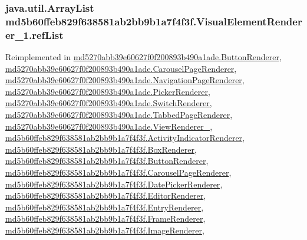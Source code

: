 {\subsubsection[{refList}]{\setlength{\rightskip}{0pt plus 5cm}java.util.ArrayList {\bf md5b60ffeb829f638581ab2bb9b1a7f4f3f.VisualElementRenderer\_\-1.refList}}}
\label{classmd5b60ffeb829f638581ab2bb9b1a7f4f3f_1_1_visual_element_renderer__1_4ebd0e42ebd360712eb189930036fc9f}




Reimplemented in \hyperlink{classmd5270abb39e60627f0f200893b490a1ade_1_1_button_renderer_2a4a0404703b01e8d3b5f88cd8313a90}{md5270abb39e60627f0f200893b490a1ade.ButtonRenderer}, \hyperlink{classmd5270abb39e60627f0f200893b490a1ade_1_1_carousel_page_renderer_d48d9d828a4c63961f1670b716f7dacb}{md5270abb39e60627f0f200893b490a1ade.CarouselPageRenderer}, \hyperlink{classmd5270abb39e60627f0f200893b490a1ade_1_1_navigation_page_renderer_d437aec87e29f0fb2592513dc48257bd}{md5270abb39e60627f0f200893b490a1ade.NavigationPageRenderer}, \hyperlink{classmd5270abb39e60627f0f200893b490a1ade_1_1_picker_renderer_63b7af8001f6b5d63bc7d868b9d12d4c}{md5270abb39e60627f0f200893b490a1ade.PickerRenderer}, \hyperlink{classmd5270abb39e60627f0f200893b490a1ade_1_1_switch_renderer_a9fe52d28f98ed4682e97e2a914a77b5}{md5270abb39e60627f0f200893b490a1ade.SwitchRenderer}, \hyperlink{classmd5270abb39e60627f0f200893b490a1ade_1_1_tabbed_page_renderer_68463cfbc83b39600752261e37af0f3d}{md5270abb39e60627f0f200893b490a1ade.TabbedPageRenderer}, \hyperlink{classmd5270abb39e60627f0f200893b490a1ade_1_1_view_renderer__2_489e61f24650a22849fddacb3f498a6b}{md5270abb39e60627f0f200893b490a1ade.ViewRenderer\_}, \hyperlink{classmd5b60ffeb829f638581ab2bb9b1a7f4f3f_1_1_activity_indicator_renderer_d465ebc26140c383de6a0a2f34b1deb4}{md5b60ffeb829f638581ab2bb9b1a7f4f3f.ActivityIndicatorRenderer}, \hyperlink{classmd5b60ffeb829f638581ab2bb9b1a7f4f3f_1_1_box_renderer_a0eecfeb6a77a84fb7b0b7562f7b7d6e}{md5b60ffeb829f638581ab2bb9b1a7f4f3f.BoxRenderer}, \hyperlink{classmd5b60ffeb829f638581ab2bb9b1a7f4f3f_1_1_button_renderer_c9e5222d65858404501d5566e4a2de8a}{md5b60ffeb829f638581ab2bb9b1a7f4f3f.ButtonRenderer}, \hyperlink{classmd5b60ffeb829f638581ab2bb9b1a7f4f3f_1_1_carousel_page_renderer_01f3b95caffdb860759fbe4bafdefc03}{md5b60ffeb829f638581ab2bb9b1a7f4f3f.CarouselPageRenderer}, \hyperlink{classmd5b60ffeb829f638581ab2bb9b1a7f4f3f_1_1_date_picker_renderer_5c0de23da8ef6f756d8fd093f26c30c6}{md5b60ffeb829f638581ab2bb9b1a7f4f3f.DatePickerRenderer}, \hyperlink{classmd5b60ffeb829f638581ab2bb9b1a7f4f3f_1_1_editor_renderer_1cb544d5489e550f07655a227272eb99}{md5b60ffeb829f638581ab2bb9b1a7f4f3f.EditorRenderer}, \hyperlink{classmd5b60ffeb829f638581ab2bb9b1a7f4f3f_1_1_entry_renderer_58f9f17859b75ef1547191607bb86aaa}{md5b60ffeb829f638581ab2bb9b1a7f4f3f.EntryRenderer}, \hyperlink{classmd5b60ffeb829f638581ab2bb9b1a7f4f3f_1_1_frame_renderer_21cc95191ee8ae27b886228f196f3939}{md5b60ffeb829f638581ab2bb9b1a7f4f3f.FrameRenderer}, \hyperlink{classmd5b60ffeb829f638581ab2bb9b1a7f4f3f_1_1_image_renderer_1489fe181115bffda1ea70a17aeeaedc}{md5b60ffeb829f638581ab2bb9b1a7f4f3f.ImageRenderer}, 